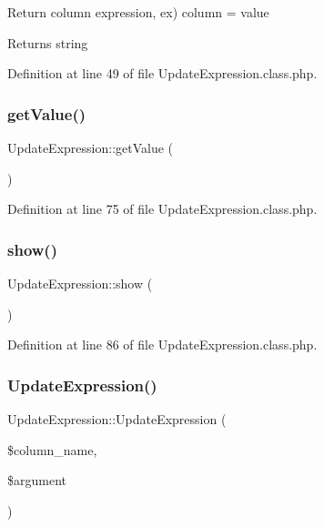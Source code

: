 Return column expression, ex) column = value \begin{DoxyReturn}{Returns}
string 
\end{DoxyReturn}


Definition at line 49 of file Update\+Expression.\+class.\+php.

\mbox{\label{classUpdateExpression_a56d4244ba753a420fc8b6db3b10fc9f9}} 
\subsubsection{\texorpdfstring{get\+Value()}{getValue()}}
{\footnotesize\ttfamily Update\+Expression\+::get\+Value (\begin{DoxyParamCaption}{ }\end{DoxyParamCaption})}



Definition at line 75 of file Update\+Expression.\+class.\+php.

\mbox{\label{classUpdateExpression_a3d3ea00a85cdf7e086139e4544e757e0}} 
\subsubsection{\texorpdfstring{show()}{show()}}
{\footnotesize\ttfamily Update\+Expression\+::show (\begin{DoxyParamCaption}{ }\end{DoxyParamCaption})}



Definition at line 86 of file Update\+Expression.\+class.\+php.

\mbox{\label{classUpdateExpression_a3e1cc24e9a7181ef791586f7607b86b9}} 
\subsubsection{\texorpdfstring{Update\+Expression()}{UpdateExpression()}}
{\footnotesize\ttfamily Update\+Expression\+::\+Update\+Expression (\begin{DoxyParamCaption}\item[{}]{\$column\+\_\+name,  }\item[{}]{\$argument }\end{DoxyParamCaption})}

